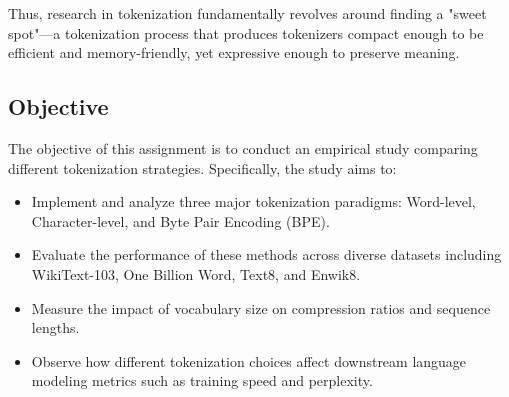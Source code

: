 Thus, research in tokenization fundamentally revolves around finding a "sweet spot"—a tokenization process that produces tokenizers compact enough to be efficient and memory-friendly, yet expressive enough to preserve meaning.

\subsection{Objective}
The objective of this assignment is to conduct an empirical study comparing different tokenization strategies. Specifically, the study aims to:
\begin{itemize}
    \item Implement and analyze three major tokenization paradigms: Word-level, Character-level, and Byte Pair Encoding (BPE).
    \item Evaluate the performance of these methods across diverse datasets including WikiText-103, One Billion Word, Text8, and Enwik8.
    \item Measure the impact of vocabulary size on compression ratios and sequence lengths.
    \item Observe how different tokenization choices affect downstream language modeling metrics such as training speed and perplexity.
\end{itemize}
